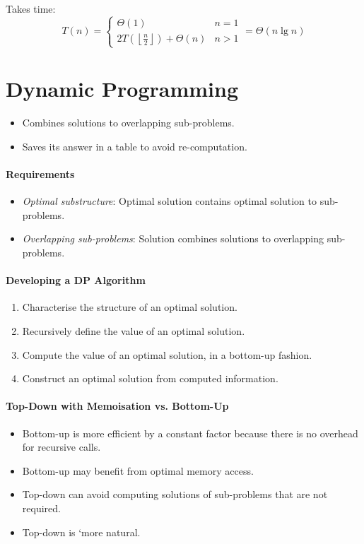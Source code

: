 \documentclass[twocolumn,english]{article}
\begin{document}
Takes time:
\[
T\left(n\right)=\begin{cases}
\Theta\left(1\right) & n=1\\
2T\left(\left\lfloor \frac{n}{2}\right\rfloor \right)+\Theta\left(n\right) & n>1
\end{cases}=\Theta\left(n\lg n\right)
\]

\section{Dynamic Programming}
\begin{itemize}
\item Combines solutions to overlapping sub-problems.
\item Saves its answer in a table to avoid re-computation.
\end{itemize}

\paragraph{Requirements}
\begin{itemize}
\item \emph{Optimal substructure}: Optimal solution contains optimal solution
to sub-problems.
\item \emph{Overlapping sub-problems}: Solution combines solutions to overlapping
sub-problems.
\end{itemize}

\paragraph{Developing a DP Algorithm}
\begin{enumerate}
\item Characterise the structure of an optimal solution.
\item Recursively define the value of an optimal solution.
\item Compute the value of an optimal solution, in a bottom-up fashion.
\item Construct an optimal solution from computed information.
\end{enumerate}

\paragraph{Top-Down with Memoisation vs. Bottom-Up}
\begin{itemize}
\item Bottom-up is more efficient by a constant factor because there is
no overhead for recursive calls.
\item Bottom-up may benefit from optimal memory access.
\item Top-down can avoid computing solutions of sub-problems that are not
required.
\item Top-down is `more natural.
\end{itemize}
\end{document}
